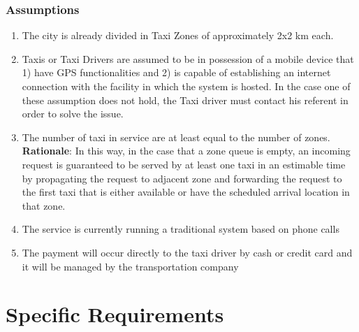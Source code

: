 \documentclass[11pt, a4paper,titlepage]{article}
\begin{document}
\subsubsection{Assumptions}
	\begin{enumerate}
		\item \label{itm: Assumption_Zones} The city is already divided in Taxi Zones of approximately 2x2 km each. 
		\item \label{itm: Assumption_MobileProvisioning} Taxis or Taxi Drivers are assumed to be in possession of a mobile device that  1) have GPS functionalities and 2) is capable of establishing an internet connection with the facility in which the system is hosted. In the case one of these assumption does not hold, the Taxi driver must contact his referent in order to solve the issue.
		\item \label{itm: Assumption_NumberOfTaxis} The number of taxi in service are at least equal to the number of zones.
		\textbf{Rationale}: In this way, in the case that a zone queue is empty, an incoming request is guaranteed to be served by at least one taxi in an estimable time by propagating the request to adjacent zone and forwarding the request to the first taxi that is either available or have the scheduled arrival location in that zone.
		\item \label{itm: Assumption_FormerSystems} The service is currently running a traditional system based on phone calls	
		\item \label{itm: Assumption_Payment} The payment will occur directly to the taxi driver by cash or credit card and it will be managed by the transportation company
		
	\end{enumerate}

\section{Specific Requirements}

\appendix
\end{document}
